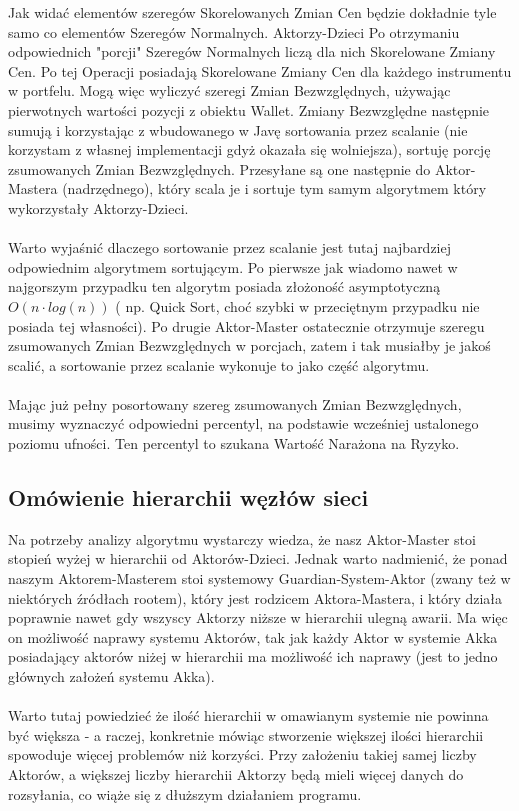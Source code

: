 \documentclass[11pt,titlepage]{article}
\numberwithin{equation}{section}
\begin{document}
Jak widać elementów szeregów Skorelowanych Zmian Cen będzie dokładnie tyle samo co elementów Szeregów Normalnych. Aktorzy-Dzieci Po otrzymaniu odpowiednich "porcji" Szeregów Normalnych liczą dla nich Skorelowane Zmiany Cen. Po tej Operacji posiadają Skorelowane Zmiany Cen dla każdego instrumentu w portfelu. Mogą więc wyliczyć szeregi Zmian Bezwzględnych, używając pierwotnych wartości pozycji z obiektu Wallet. Zmiany Bezwzględne następnie sumują i korzystając z wbudowanego w Javę sortowania przez scalanie (nie korzystam z własnej implementacji gdyż okazała się wolniejsza), sortuję porcję zsumowanych Zmian Bezwzględnych. Przesyłane są one następnie do Aktor-Mastera (nadrzędnego), który scala je i sortuje tym samym algorytmem który wykorzystały Aktorzy-Dzieci. \\
\\
Warto wyjaśnić dlaczego sortowanie przez scalanie jest tutaj najbardziej odpowiednim algorytmem sortującym. Po pierwsze jak wiadomo nawet w najgorszym przypadku ten algorytm posiada złożoność asymptotyczną $ O (n \cdot log(n)) $ ( np. Quick Sort, choć szybki w przeciętnym przypadku nie posiada tej własności). Po drugie Aktor-Master ostatecznie otrzymuje szeregu zsumowanych Zmian Bezwzględnych w porcjach, zatem i tak musiałby je jakoś scalić, a sortowanie przez scalanie wykonuje to jako część algorytmu.\\
\\
Mając już pełny posortowany szereg zsumowanych Zmian Bezwzględnych, musimy wyznaczyć odpowiedni percentyl, na podstawie wcześniej ustalonego poziomu ufności. Ten percentyl to szukana Wartość Narażona na Ryzyko.



\subsection{Omówienie hierarchii węzłów sieci}

Na potrzeby analizy algorytmu wystarczy wiedza, że nasz Aktor-Master stoi stopień wyżej w hierarchii od Aktorów-Dzieci. Jednak warto nadmienić, że ponad naszym Aktorem-Masterem stoi systemowy Guardian-System-Aktor (zwany też w niektórych źródłach rootem), który jest rodzicem Aktora-Mastera, i który działa poprawnie nawet gdy wszyscy Aktorzy niższe w hierarchii ulegną awarii. Ma więc on możliwość naprawy systemu Aktorów, tak jak każdy Aktor w systemie Akka posiadający aktorów niżej w hierarchii ma możliwość ich naprawy (jest to jedno głównych założeń systemu Akka). \\
\\
Warto tutaj powiedzieć że ilość hierarchii w omawianym systemie nie powinna być większa - a raczej, konkretnie mówiąc stworzenie większej ilości hierarchii spowoduje więcej problemów niż korzyści. Przy założeniu takiej samej liczby Aktorów, a większej liczby hierarchii Aktorzy będą mieli więcej danych do rozsyłania, co wiąże się z dłuższym działaniem programu.
\end{document}
